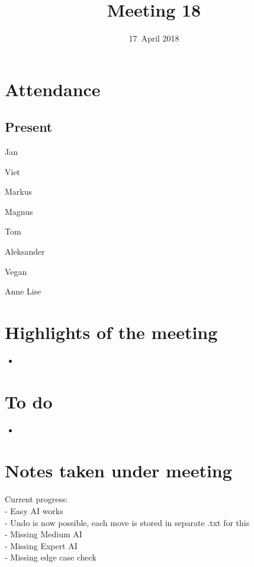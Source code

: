 \documentclass[letterpaper,11pt]{article}
\title{Meeting 18}
\date{17~April 2018}
\begin{document}
\maketitle
\section*{Attendance}
\subsection*{Present}
\begin{list}{}{}
	\item Jan
	\item Viet
	\item Markus
	\item Magnus
	\item Tom
	\item Aleksander
	\item Vegan
	\item Anne Lise
\end{list}

\newpage
\section*{Highlights of the meeting}
\begin{itemize}
	\item 
\end{itemize}

\section*{To do}
\begin{itemize}
	\item 
\end{itemize}

\section*{Notes taken under meeting}
Current progress:\\
- Easy AI works\\
- Undo is now possible, each move is stored in separate .txt for this\\
- Missing Medium AI\\
- Missing Expert AI\\
- Missing edge case check\\
\end{document}
